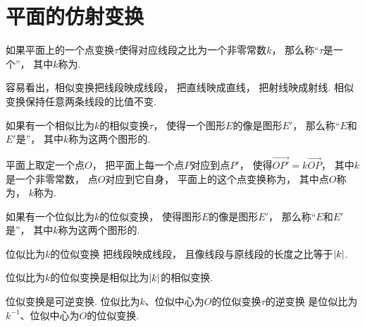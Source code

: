 \section{平面的仿射变换}

\begin{definition}
如果平面上的一个点变换\(\tau\)使得对应线段之比为一个非零常数\(k\)，
那么称“\(\tau\)是一个”，
其中\(k\)称为.
\end{definition}

容易看出，相似变换把线段映成线段，
把直线映成直线，
把射线映成射线.
相似变换保持任意两条线段的比值不变.

\begin{definition}
如果有一个相似比为\(k\)的相似变换\(\tau\)，
使得一个图形\(E\)的像是图形\(E'\)，
那么称“\(E\)和\(E'\)是”，
其中\(k\)称为这两个图形的.
\end{definition}

\begin{definition}
平面上取定一个点\(O\)，
把平面上每一个点\(P\)对应到点\(P'\)，
使得\(\vec{OP'} = k \vec{OP}\)，
其中\(k\)是一个非零常数，
点\(O\)对应到它自身，
平面上的这个点变换称为，
其中点\(O\)称为，
\(k\)称为.
\end{definition}

\begin{definition}
如果有一个位似比为\(k\)的位似变换，
使得图形\(E\)的像是图形\(E'\)，
那么称“\(E\)和\(E'\)是”，
其中\(k\)称为这两个图形的.
\end{definition}

\begin{proposition}
位似比为\(k\)的位似变换
把线段映成线段，
且像线段与原线段的长度之比等于\(\abs{k}\).
\end{proposition}

\begin{corollary}
位似比为\(k\)的位似变换是相似比为\(\abs{k}\)的相似变换.
\end{corollary}

\begin{proposition}
位似变换是可逆变换.
位似比为\(k\)、位似中心为\(O\)的位似变换\(\tau\)的逆变换
是位似比为\(k^{-1}\)、位似中心为\(O\)的位似变换.
\end{proposition}

